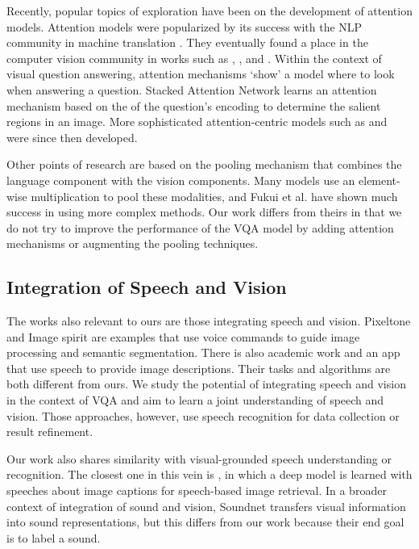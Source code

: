 \documentclass[letterpaper]{article} %
\begin{document}
Recently, popular topics of exploration have been on the development of attention models. Attention models were popularized by its success with the NLP community in machine translation . They eventually found a place in the computer vision community in works such as , , and . Within the context of visual question answering, attention mechanisms `show' a model where to look when answering a question. Stacked Attention Network  learns an attention mechanism based on the of the question's encoding to determine the salient regions in an image. More sophisticated attention-centric models such as  and  were since then developed.

Other points of research are based on the pooling mechanism that combines the language component with the vision components. Many models    use an element-wise multiplication to pool these modalities,  and Fukui et al.  have shown much success in using more complex methods. Our work differs from theirs in that we do not try to improve the performance of the VQA model by adding attention mechanisms or augmenting the pooling techniques.


\subsection{Integration of Speech and Vision}
The works also relevant to ours are those integrating speech and vision. Pixeltone 
and Image spirit  are examples that use voice
commands to guide image processing and semantic segmentation. There is also academic work    and an app  that use speech to provide image descriptions. Their tasks and algorithms are both different from ours. We study the potential of integrating speech and vision in the context of VQA and aim to learn a joint understanding of speech and vision. Those approaches, however, use speech recognition for data collection or result refinement.

Our work also shares similarity with visual-grounded speech understanding or recognition. The closest one in this vein is , in which a deep model is learned with speeches about image captions for speech-based image retrieval. In a broader context of integration of sound and vision, Soundnet  transfers visual information into sound representations, but this differs from our work because their end goal is to label a sound.
\end{document}
